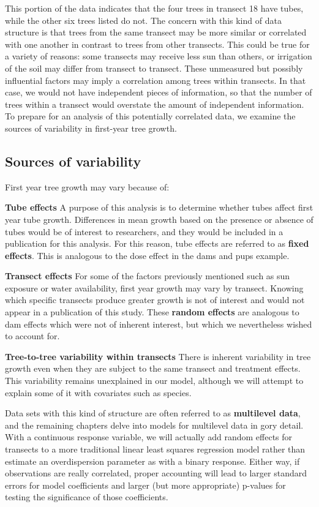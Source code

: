 \documentclass[
]{krantz}
\begin{document}
This portion of the data indicates that the four trees in transect 18 have tubes, while the other six trees listed do not. The concern with this kind of data structure is that trees from the same transect may be more similar or correlated with one another in contrast to trees from other transects. This could be true for a variety of reasons: some transects may receive less sun than others, or irrigation of the soil may differ from transect to transect. These unmeasured but possibly influential factors may imply a correlation among trees within transects. In that case, we would not have independent pieces of information, so that the number of trees within a transect would overstate the amount of independent information. To prepare for an analysis of this potentially correlated data, we examine the sources of variability in first-year tree growth.

\hypertarget{sources-of-variability-1}{%
\subsection{Sources of variability}\label{sources-of-variability-1}}

First year tree growth may vary because of:

\textbf{Tube effects} A purpose of this analysis is to determine whether tubes affect first year tube growth. Differences in mean growth based on the presence or absence of tubes would be of interest to researchers, and they would be included in a publication for this analysis. For this reason, tube effects are referred to as \textbf{fixed effects}. This is analogous to the dose effect in the dams and pups example.

\textbf{Transect effects} For some of the factors previously mentioned such as sun exposure or water availability, first year growth may vary by transect. Knowing which specific transects produce greater growth is not of interest and would not appear in a publication of this study. These \textbf{random effects} are analogous to dam effects which were not of inherent interest, but which we nevertheless wished to account for.

\textbf{Tree-to-tree variability within transects} There is inherent variability in tree growth even when they are subject to the same transect and treatment effects. This variability remains unexplained in our model, although we will attempt to explain some of it with covariates such as species.

Data sets with this kind of structure are often referred to as \textbf{multilevel data},  and the remaining chapters delve into models for multilevel data in gory detail. With a continuous response variable, we will actually add random effects for transects to a more traditional linear least squares regression model rather than estimate an overdispersion parameter as with a binary response. Either way, if observations are really correlated, proper accounting will lead to larger standard errors for model coefficients and larger (but more appropriate) p-values for testing the significance of those coefficients.
\end{document}
